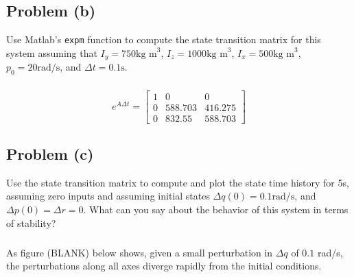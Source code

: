 \documentclass[11pt]{article}
\begin{document}
\subsection*{Problem (b)}
Use Matlab's \texttt{expm} function to compute the state transition matrix for this system assuming that $I_y=750\text{kg m}^3$, $I_z=1000\text{kg m}^3$, $I_x=500 \text{kg m}^3$, $p_0 = 20 \text{rad/s}$, and $\Delta t=0.1\text{s}$.

\subparagraph*{}
\begin{equation*}
	e^{A\Delta t} = \begin{bmatrix}
					1 & 0 & 0 \\
					0 & 588.703 & 416.275 \\
					0 & 832.55 & 588.703
					\end{bmatrix}
\end{equation*}

\subsection*{Problem (c)}
Use the state transition matrix to compute and plot the state time history for 5s, assuming zero inputs and assuming initial states $\Delta q(0) = 0.1\text{rad/s}$, and $\Delta p(0) = \Delta r = 0$. What can you say about the behavior of this system in terms of stability?

\subparagraph*{}
As figure (BLANK) below shows, given a small perturbation in $\Delta q$ of $0.1$ rad/s, the perturbations along all axes diverge rapidly from the initial conditions.
\end{document}
